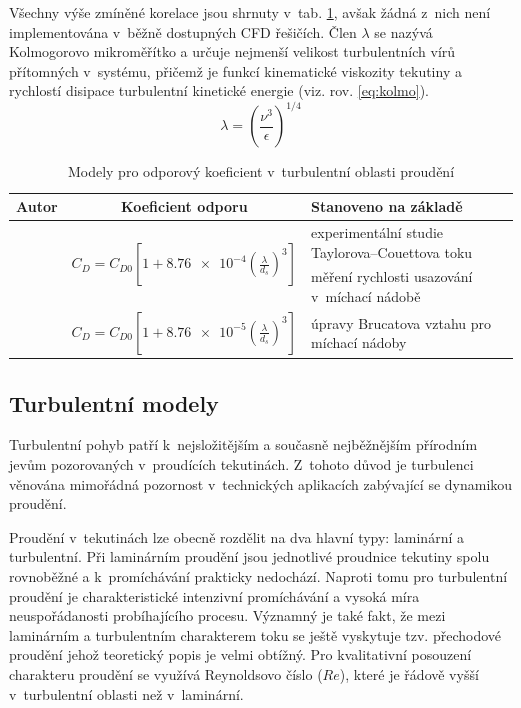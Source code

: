 Všechny výše zmíněné korelace jsou shrnuty v~tab. \ref{tab:cds}, avšak žádná z~nich není implementována v~běžně dostupných CFD řešičích. Člen $\lambda$ se nazývá Kolmogorovo mikroměřítko a určuje nejmenší velikost turbulentních vírů přítomných v~systému, přičemž je funkcí kinematické viskozity tekutiny a rychlostí disipace turbulentní kinetické energie (viz. rov. \ref{eq:kolmo}).
\begin{equation}
  \lambda = \left( \frac{\nu^{3}}{\epsilon} \right) ^{1/4}
	\label{eq:kolmo}
\end{equation}

\begin{table}[h!]
\centering
\caption{Modely pro odporový koeficient v~turbulentní oblasti proudění}
\label{tab:cds}
\begin{tabular}{cc>{\centering\arraybackslash}p{5cm}}
\toprule
\textbf{Autor} & \textbf{Koeficient odporu} & \textbf{Stanoveno na základě} \\
\midrule{}

\multirow{2}{*}{\citet{bru98}} & \multirow{2}{*}{$C_{D} = C_{D0} \left[ 1 + \num{8.76e-4} \left( \frac{\lambda}{d_{s}} \right)^{3} \right] $} & experimentální studie Taylorova–Couettova toku \\ \addlinespace

\multirow{2}{*}{\citet{pin01}} & \multirow{2}{*}{$C_{D} = C_{D0} \left[ \num{0.4}\tanh\left(  \frac{16\lambda}{d_{s}} - 1  \right) \right] ^{-2}$} & měření rychlosti usazování v~míchací nádobě \\ \addlinespace

\multirow{2}{*}{\citet{kho06}} & \multirow{2}{*}{$C_{D} = C_{D0} \left[ 1 + \num{8.76e-5} \left( \frac{\lambda}{d_{s}} \right)^{3} \right]$} & úpravy Brucatova vztahu pro míchací nádoby  \\

\bottomrule
\end{tabular}
\end{table}

\subsection{Turbulentní modely}
Turbulentní pohyb patří k~nejsložitějším a současně nejběžnějším přírodním jevům pozorovaných v~proudících tekutinách. Z~tohoto důvod je turbulenci věnována mimořádná pozornost v~technických aplikacích zabývající se dynamikou proudění. 

Proudění v~tekutinách lze obecně rozdělit na dva hlavní typy: laminární a turbulentní. Při laminárním proudění jsou jednotlivé proudnice tekutiny spolu rovnoběžné a k~promíchávání prakticky nedochází. Naproti tomu pro turbulentní proudění je charakteristické intenzivní promíchávání a vysoká míra neuspořádanosti probíhajícího procesu. Významný je také fakt, že mezi laminárním a turbulentním charakterem toku se ještě vyskytuje tzv. přechodové proudění jehož teoretický popis je velmi obtížný. Pro kvalitativní posouzení charakteru proudění se využívá Reynoldsovo číslo ($Re$), které je řádově vyšší v~turbulentní oblasti než v~laminární. 

